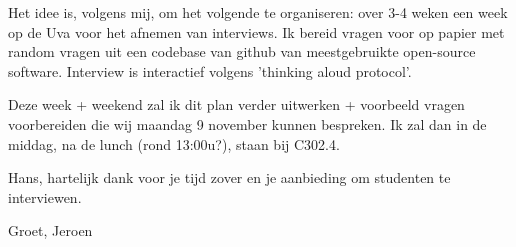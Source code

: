 Het idee is, volgens mij, om het volgende te organiseren: over 3-4 weken een week op de Uva voor het afnemen van interviews. Ik bereid vragen voor op papier met random vragen uit een codebase van github van meestgebruikte open-source software. Interview is interactief volgens 'thinking aloud protocol'.

Deze week + weekend zal ik dit plan verder uitwerken + voorbeeld vragen voorbereiden die wij maandag 9 november kunnen bespreken. Ik zal dan in de middag, na de lunch (rond 13:00u?), staan bij C302.4.

Hans, hartelijk dank voor je tijd zover en je aanbieding om studenten te interviewen.

Groet,
Jeroen